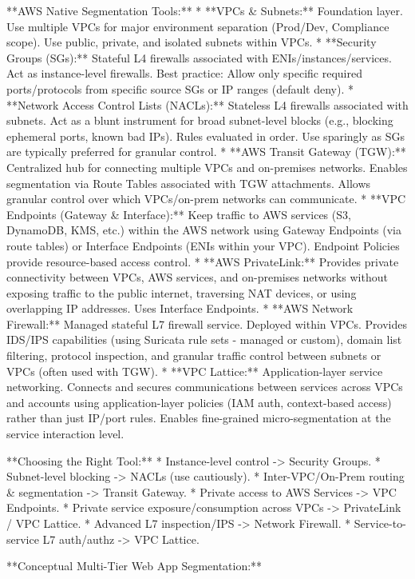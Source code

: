 \documentclass{article}
\begin{document}
**AWS Native Segmentation Tools:**
* **VPCs & Subnets:** Foundation layer. Use multiple VPCs for major environment separation (Prod/Dev, Compliance scope). Use public, private, and isolated subnets within VPCs.
* **Security Groups (SGs):** Stateful L4 firewalls associated with ENIs/instances/services. Act as instance-level firewalls. Best practice: Allow only specific required ports/protocols from specific source SGs or IP ranges (default deny).
* **Network Access Control Lists (NACLs):** Stateless L4 firewalls associated with subnets. Act as a blunt instrument for broad subnet-level blocks (e.g., blocking ephemeral ports, known bad IPs). Rules evaluated in order. Use sparingly as SGs are typically preferred for granular control.
* **AWS Transit Gateway (TGW):** Centralized hub for connecting multiple VPCs and on-premises networks. Enables segmentation via Route Tables associated with TGW attachments. Allows granular control over which VPCs/on-prem networks can communicate.
* **VPC Endpoints (Gateway & Interface):** Keep traffic to AWS services (S3, DynamoDB, KMS, etc.) within the AWS network using Gateway Endpoints (via route tables) or Interface Endpoints (ENIs within your VPC). Endpoint Policies provide resource-based access control.
* **AWS PrivateLink:** Provides private connectivity between VPCs, AWS services, and on-premises networks without exposing traffic to the public internet, traversing NAT devices, or using overlapping IP addresses. Uses Interface Endpoints.
* **AWS Network Firewall:** Managed stateful L7 firewall service. Deployed within VPCs. Provides IDS/IPS capabilities (using Suricata rule sets - managed or custom), domain list filtering, protocol inspection, and granular traffic control between subnets or VPCs (often used with TGW).
* **VPC Lattice:** Application-layer service networking. Connects and secures communications between services across VPCs and accounts using application-layer policies (IAM auth, context-based access) rather than just IP/port rules. Enables fine-grained micro-segmentation at the service interaction level.

**Choosing the Right Tool:**
* Instance-level control -> Security Groups.
* Subnet-level blocking -> NACLs (use cautiously).
* Inter-VPC/On-Prem routing & segmentation -> Transit Gateway.
* Private access to AWS Services -> VPC Endpoints.
* Private service exposure/consumption across VPCs -> PrivateLink / VPC Lattice.
* Advanced L7 inspection/IPS -> Network Firewall.
* Service-to-service L7 auth/authz -> VPC Lattice.

**Conceptual Multi-Tier Web App Segmentation:**
\end{document}
